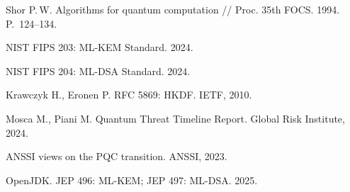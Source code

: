 \documentclass[a4paper,10pt]{article}
\newcommand{\sect}[2]{\par\vspace{1.4mm}\noindent{\sffamily\bfseries\fontsize{7}{8.5}\selectfont
  \if\relax\detokenize{#1}\relax\else\textcolor{pqc}{#1}\hspace{1.3mm}\fi\MakeUppercase{#2}}\par\nopagebreak\vspace{0.7mm}}
\begin{document}
\begin{multicols}{2}
\sect{}{Литература}
{\fontsize{6.5}{7.9}\selectfont\color{ink2}
\noindent\hangindent=3.5mmShor P.\,W. Algorithms for quantum computation // Proc. 35th FOCS. 1994. P.~124–134.\par
\noindent\hangindent=3.5mmNIST FIPS 203: ML-KEM Standard. 2024.\par
\noindent\hangindent=3.5mmNIST FIPS 204: ML-DSA Standard. 2024.\par
\noindent\hangindent=3.5mmKrawczyk H., Eronen P. RFC 5869: HKDF. IETF, 2010.\par
\noindent\hangindent=3.5mmMosca M., Piani M. Quantum Threat Timeline Report. Global Risk Institute, 2024.\par
\noindent\hangindent=3.5mmANSSI views on the PQC transition. ANSSI, 2023.\par
\noindent\hangindent=3.5mmOpenJDK. JEP 496: ML-KEM; JEP 497: ML-DSA. 2025.\par
}
\end{multicols}
\end{document}
